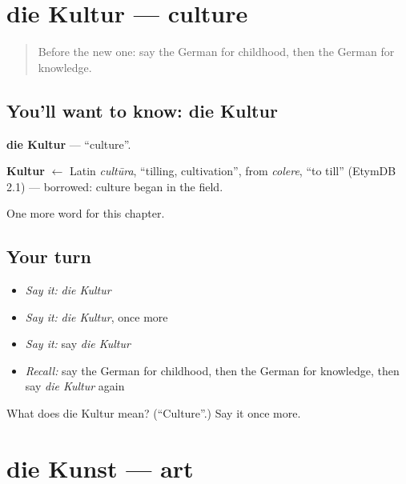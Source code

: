 \section[die Kultur]{die Kultur — culture}

\label{lesson:GE-C232-kultur}



\begin{quote}
Before the new one: say the German for childhood, then the German for knowledge.
\end{quote}

\subsection*{You'll want to know: die Kultur}
\textbf{die Kultur} — \textquotedblleft{}culture\textquotedblright{}.

\begin{cousinweb}
\textbf{Kultur} $\leftarrow$ Latin \emph{cultūra}, \textquotedblleft{}tilling, cultivation\textquotedblright{}, from \emph{colere}, \textquotedblleft{}to till\textquotedblright{} (EtymDB 2.1) — borrowed: culture began in the field.
\end{cousinweb}

\begin{grammarlens}[title={What you've built}]
One more word for this chapter.
\end{grammarlens}

\subsection*{Your turn}
\begin{itemize}
\raggedright
  \item \emph{Say it:} \emph{die Kultur}
  \item \emph{Say it:} \emph{die Kultur}, once more
  \item \emph{Say it:} say \emph{die Kultur}
  \item \emph{Recall:} say the German for childhood, then the German for knowledge, then say \emph{die Kultur} again
\end{itemize}

\begin{tcolorbox}[breakable,colback=teal!4,colframe=teal!35!black,title={Before you move on}]
What does die Kultur mean? (\textquotedblleft{}Culture\textquotedblright{}.) Say it once more.
\end{tcolorbox}
\section[die Kunst]{die Kunst — art}

